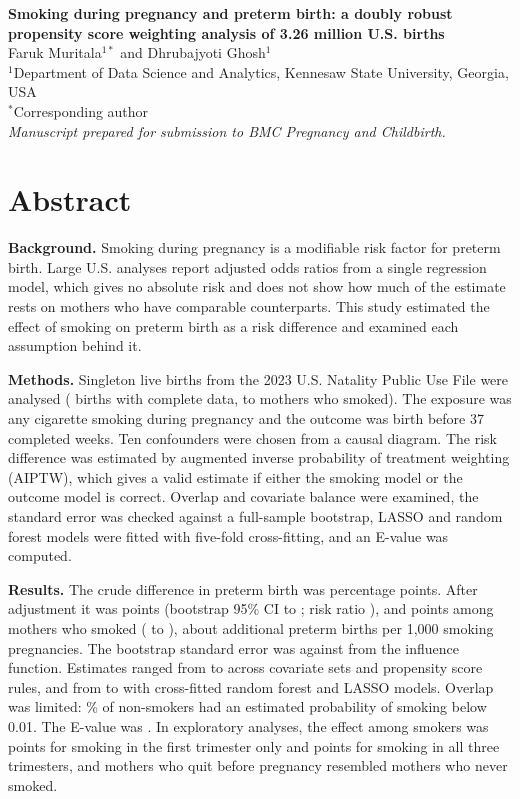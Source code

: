 \documentclass[11pt,letterpaper]{article}
\begin{document}
\begin{flushleft}
{\LARGE\bfseries Smoking during pregnancy and preterm birth: a doubly robust propensity score weighting analysis of 3.26 million U.S. births}\\[14pt]
{\large Faruk Muritala$^{1*}$ and Dhrubajyoti Ghosh$^{1}$}\\[8pt]
$^{1}$Department of Data Science and Analytics, Kennesaw State University, Georgia, USA\\[2pt]
$^{*}$Corresponding author\\[10pt]
\textit{Manuscript prepared for submission to BMC Pregnancy and Childbirth.}
\end{flushleft}

\section*{Abstract}
\textbf{Background.} Smoking during pregnancy is a modifiable risk factor for preterm birth. Large U.S. analyses report adjusted odds ratios from a single regression model, which gives no absolute risk and does not show how much of the estimate rests on mothers who have comparable counterparts. This study estimated the effect of smoking on preterm birth as a risk difference and examined each assumption behind it.

\textbf{Methods.} Singleton live births from the 2023 U.S. Natality Public Use File were analysed (\NTotal{} births with complete data, \NSmokers{} to mothers who smoked). The exposure was any cigarette smoking during pregnancy and the outcome was birth before 37 completed weeks. Ten confounders were chosen from a causal diagram. The risk difference was estimated by augmented inverse probability of treatment weighting (AIPTW), which gives a valid estimate if either the smoking model or the outcome model is correct. Overlap and covariate balance were examined, the standard error was checked against a full-sample bootstrap, LASSO and random forest models were fitted with five-fold cross-fitting, and an E-value was computed.

\textbf{Results.} The crude difference in preterm birth was \CrudeRD{} percentage points. After adjustment it was \RDmain{} points (bootstrap 95\% CI \BootLo{} to \BootHi{}; risk ratio \RRmain{}), and \ATT{} points among mothers who smoked (\ATTlo{} to \ATThi{}), about \ExcessPerK{} additional preterm births per 1,000 smoking pregnancies. The bootstrap standard error was \SEboot{} against \SEif{} from the influence function. Estimates ranged from \RangeMin{} to \RangeMax{} across covariate sets and propensity score rules, and from \CFForest{} to \CFLasso{} with cross-fitted random forest and LASSO models. Overlap was limited: \LowNon{}\% of non-smokers had an estimated probability of smoking below 0.01. The E-value was \EV{}. In exploratory analyses, the effect among smokers was \TriAATT{} points for smoking in the first trimester only and \TriCATT{} points for smoking in all three trimesters, and mothers who quit before pregnancy resembled mothers who never smoked.
\end{document}
